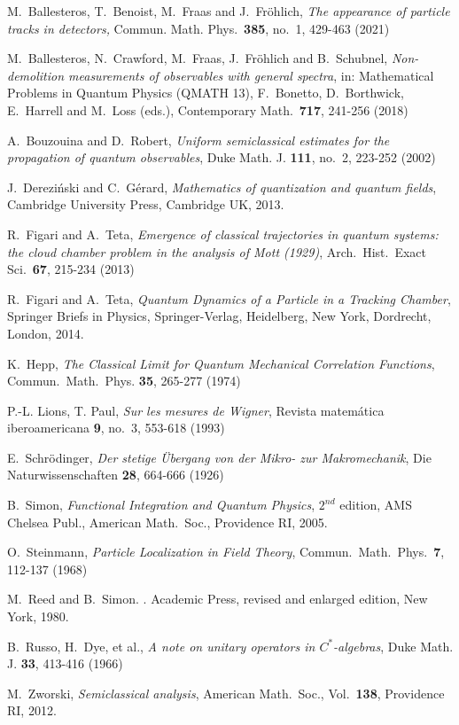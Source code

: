 \documentclass[11pt]{article}
\begin{document}
\begin{thebibliography}{References}

 M.~Ballesteros, T.~Benoist, M.~Fraas and J.~Fr\"{o}hlich, \textit{The appearance of particle tracks in detectors,} Commun. Math. Phys.~\textbf{385}, no.~1, 429-463 (2021)

 M.~Ballesteros, N.~Crawford, M.~Fraas, J.~Fr\"ohlich and B.~Schubnel, \textit{Non-demolition
measurements of observables with general spectra}, in: Mathematical Problems in Quantum Physics (QMATH 13), 
F.~Bonetto, D.~Borthwick, E.~Harrell and M.~Loss (eds.), Contemporary Math.~{\bf{717}}, 241-256 (2018)

 A.~Bouzouina and D.~Robert, \textit{Uniform semiclassical estimates for the propagation of quantum observables}, Duke Math. J. {\bf{111}}, no.~2, 223-252 (2002)

 J.~Dereziński and C.~Gérard, \textit{Mathematics of quantization and quantum fields}, Cambridge University Press, Cambridge UK, 2013.

 R.~Figari and A.~Teta, \textit{Emergence of classical trajectories in quantum systems: the cloud chamber problem in the analysis of Mott (1929)}, Arch.~Hist.~Exact Sci.~{\bf{67}}, 215-234 (2013)

 R.~Figari and A.~Teta, \textit{Quantum Dynamics of a Particle in a Tracking Chamber}, Springer Briefs in Physics, Springer-Verlag, Heidelberg, New York, Dordrecht, London, 2014.

 K.~Hepp, \textit{The Classical Limit for Quantum Mechanical Correlation Functions}, Commun.~Math.~Phys. {\bf{35}}, 265-277 (1974)

 P.-L. Lions, T. Paul, \textit{Sur les mesures de Wigner}, Revista matem\'atica iberoamericana {\bf{9}}, no.~3, 553-618 (1993)

 E.~Schr\"odinger, \textit{Der stetige \"Ubergang von der Mikro- zur Makromechanik}, Die Naturwissenschaften {\bf{28}}, 664-666 (1926)

 B.~Simon, \textit{Functional Integration and Quantum Physics}, $2^{nd}$ edition, AMS Chelsea Publ., American Math.~Soc., Providence RI, 2005.

 O.~Steinmann, \textit{Particle Localization in Field Theory}, Commun.~Math.~Phys.~{\bf{7}}, 112-137 (1968)

M.~Reed and B.~Simon.
.
\newblock Academic Press, revised and enlarged edition, New York, 1980.

 B.~Russo, H.~Dye, et al., \textit{A note on unitary operators in $C^{*}$-algebras}, Duke Math. J. {\bf{33}}, 413-416 (1966)

 M.~Zworski, \textit{Semiclassical analysis}, American Math.~Soc., Vol.~{\bf{138}}, Providence RI, 2012.


\end{thebibliography}
\end{document}
